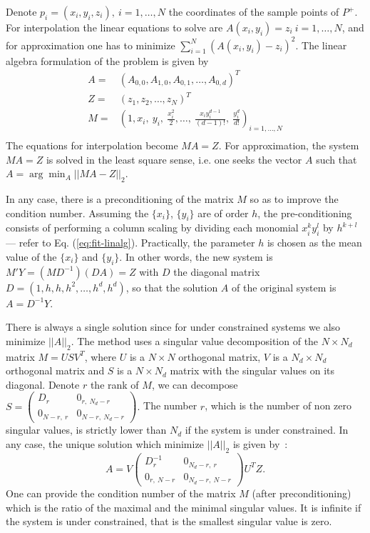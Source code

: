 \begin{ccAdvanced}
Denote $p_i=(x_i,y_i,z_i), \ i=1,\ldots , N$ the coordinates of the
sample points of $P^+$.
For interpolation the linear equations to solve are $A(x_i,y_i)=z_i \
i=1,\ldots,N$, and for approximation one has to minimize $\sum_{i=1}^N
(A(x_i,y_i)-z_i)^2$. The linear algebra formulation of the problem is
given by
%
\begin{eqnarray}
\label{eq:fit-linalg}
 A =  & (A_{0,0}, A_{1,0},A_{0,1}, \ldots , A_{0,d})^T \\ 
 Z=  &(z_1, z_2,\ldots , z_N)^T \\ 
 M=  &(1,x_i,\ y_i,\ \frac{x_i^2}{2},\ldots ,
\ \frac{x_iy_i^{d-1}}{(d-1)!},\ \frac{y_i^d}{d!})_{i=1,...,N}\\
\end{eqnarray}
%
The equations for interpolation become $MA=Z$. For approximation, the
system $MA=Z$ is solved in the least square sense, i.e. one seeks the
vector $A$ such that $A = \arg \min_A ||MA-Z||_2$.

In any case, there is a preconditioning of the matrix $M$ so as to
improve the condition number. Assuming the $\{x_i\}$, $\{y_i\}$ are of
order $h$, the pre-conditioning consists of performing a column
scaling by dividing each monomial $x_i^ky_i^l$ by $h^{k+l}$ --- refer
to Eq. (\ref{eq:fit-linalg}). Practically, the parameter $h$ is chosen
as the mean value of the $\{x_i\}$ and $\{y_i\}$. In other words, the
new system is $M'Y=(MD^{-1})(DA)=Z$ with $D$ the diagonal matrix
$D=(1,h,h,h^2,\ldots,h^d,h^d)$, so that the solution $A$ of the
original system is $A=D^{-1}Y$.

There is always a single solution since for under constrained systems
we also minimize $||A||_2$.  The method uses a singular value
decomposition of the $N\times N_d$ matrix $M= U S V^T$, where $U$ is a
$N \times N$ orthogonal matrix, $V$ is a $N_d \times N_d$ orthogonal
matrix and $S$ is a $N\times N_d$ matrix with the singular values on
its diagonal. Denote $r$ the rank of $M$, we can decompose
%
$S= \left( \begin{array}{cc}
D_r & 0_{r,\ N_d-r}\\
0_{N-r,\ r} & 0_{N-r,\ N_d-r}
\end{array} 
\right).
$
%
The number $r$, which is the number of non zero singular values, is
strictly lower than $N_d$ if the system is under constrained. In any
case, the unique solution which minimize $||A||_2$ is given by~:
\begin{equation}
A= V
\left( \begin{array}{cc}
D_r^{-1} & 0_{N_d-r,\ r}\\
0_{r,\ N-r} & 0_{N_d-r,\ N-r}
\end{array} 
\right)
 U^TZ.
\end{equation}
One can provide the condition number of the matrix $M$ (after
preconditioning) which is the ratio of the maximal and the minimal
singular values. It is infinite if the system is under constrained,
that is the smallest singular value is zero.


\end{ccAdvanced}
